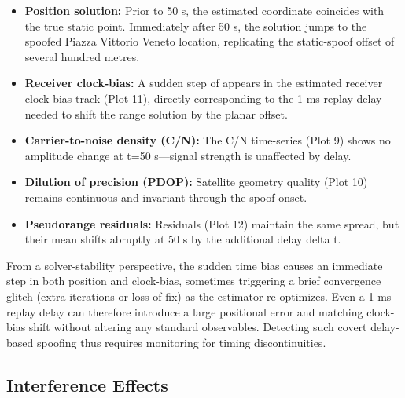         \begin{itemize}
            \item \textbf{Position solution:} Prior to 50 s, the estimated coordinate coincides with the true static point. Immediately after 50 s, the solution jumps to the spoofed Piazza Vittorio Veneto location, replicating the static-spoof offset of several hundred metres.  
            \item \textbf{Receiver clock-bias:} A sudden step of appears in the estimated receiver clock-bias track (Plot 11), directly corresponding to the 1 ms replay delay needed to shift the range solution by the planar offset.  
            \item \textbf{Carrier-to-noise density (C/N):} The C/N time-series (Plot 9) shows no amplitude change at t=50 s—signal strength is unaffected by delay.  
            \item \textbf{Dilution of precision (PDOP):} Satellite geometry quality (Plot 10) remains continuous and invariant through the spoof onset.  
            \item \textbf{Pseudorange residuals:} Residuals (Plot 12) maintain the same spread, but their mean shifts abruptly at 50 s by the additional delay delta t.  
        \end{itemize}
        
        \noindent From a solver-stability perspective, the sudden time bias causes an immediate step in both position and clock-bias, sometimes triggering a brief convergence glitch (extra iterations or loss of fix) as the estimator re-optimizes. 
        Even a 1 ms replay delay can therefore introduce a large positional error and matching clock-bias shift without altering any standard observables. Detecting such covert delay-based spoofing thus requires monitoring for timing discontinuities.

    \subsection{Interference Effects}
    

